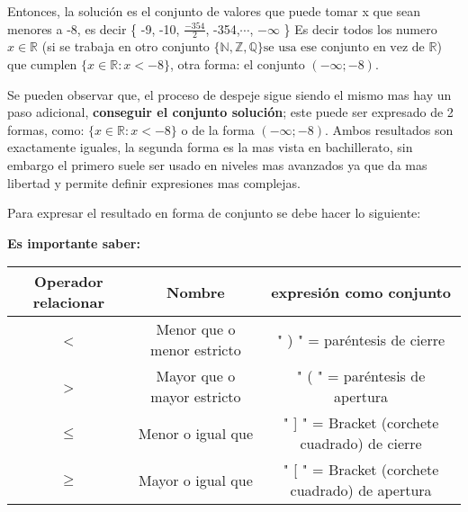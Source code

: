     Entonces, la solución es el conjunto de valores que puede tomar x que sean
    menores a -8, es decir \{ -9, -10, $\displaystyle\frac{-354}{2} $, -354,$\cdots$, $-\infty$   \}
    Es decir todos los numero $x \in \mathbb{R}$ (si se trabaja en otro conjunto
    $\{\mathbb{N},\mathbb{Z},\mathbb{Q}\} \text{se usa ese conjunto en vez de }\mathbb{R}$)
    que cumplen $\{x \in \mathbb{R}:x < -8\}$, otra forma: el conjunto $(-\infty;-8)$.

    Se pueden observar que, el proceso de despeje sigue siendo el mismo mas hay
    un paso adicional, \textbf{conseguir el conjunto solución}; este puede ser
    expresado de 2 formas, como: $\{x \in \mathbb{R}:x < -8\}$ o de la forma
    $(-\infty;-8)$. Ambos resultados son exactamente iguales, la segunda forma
    es la mas vista en bachillerato, sin embargo el primero suele
    ser usado en niveles mas avanzados ya que da mas libertad y permite definir
    expresiones mas complejas.

    Para expresar el resultado en forma de conjunto se debe hacer lo siguiente:

    \textbf{Es importante saber: }


\begin{table}[H] \label{operadores-relacionales-a-conjuntos}
    \begin{adjustwidth}{-.5in}{-.5in}
        \begin{center}

            \begin{tabular}{|c|c|c|}
                \hline


                Operador relacionar & Nombre                        & expresión como conjunto\\\hline
                <                   & Menor que o menor estricto    & " ) " = paréntesis de cierre \\\hline
                >                   & Mayor que o mayor estricto    & " ( " = paréntesis de apertura\\\hline
                $\leq$              & Menor o igual que             & " ] " = Bracket (corchete cuadrado) de cierre \\\hline
                $\geq$              & Mayor o igual que             & " [ " = Bracket (corchete cuadrado) de apertura \\

                \hline
            \end{tabular}

        \end{center}
    \end{adjustwidth}
\end{table}


